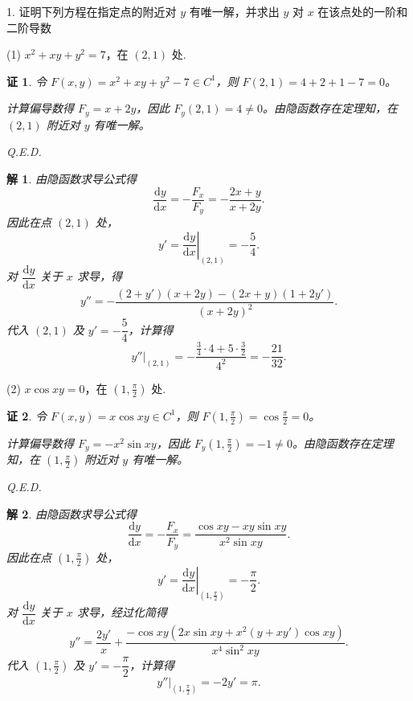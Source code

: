 \documentclass[a4paper,12pt]{article}
\newtheorem*{pf}{证}
\newtheorem*{sol}{解}
\begin{document}
1. 证明下列方程在指定点的附近对 $y$ 有唯一解，并求出 $y$ 对 $x$ 在该点处的一阶和二阶导数

(1) $x^2 + xy + y^2 = 7$，在 $(2,1)$ 处.

\begin{pf}
    令 $F(x,y) = x^2 + xy + y^2 - 7 \in C^1$，则 $F(2,1) = 4 + 2 + 1 - 7 = 0$。

    计算偏导数得 $F_y = x + 2y$，因此 $F_y(2,1) = 4 \neq 0$。由隐函数存在定理知，在 $(2,1)$ 附近对 $y$ 有唯一解。

    Q.E.D.
\end{pf}

\begin{sol}
    由隐函数求导公式得
    $$
        \frac{\mathrm{d}y}{\mathrm{d}x} = -\frac{F_x}{F_y} = -\frac{2x + y}{x + 2y}.
    $$
    因此在点 $(2,1)$ 处，
    $$
        y' = \left.\frac{\mathrm{d}y}{\mathrm{d}x}\right|_{(2,1)} = -\frac{5}{4}.
    $$
    对 $\dfrac{\mathrm{d}y}{\mathrm{d}x}$ 关于 $x$ 求导，得
    $$
        y'' = -\frac{(2 + y')(x + 2y) - (2x + y)(1 + 2y')}{(x + 2y)^2}.
    $$
    代入 $(2,1)$ 及 $y' = -\dfrac{5}{4}$，计算得
    $$
        y''|_{(2,1)} = -\frac{\frac{3}{4} \cdot 4 + 5 \cdot \frac{3}{2}}{4^2} = -\frac{21}{32}.
    $$
\end{sol}

(2) $x\cos xy = 0$，在 $(1,\frac{\pi}{2})$ 处.

\begin{pf}
    令 $F(x,y) = x\cos xy \in C^1$，则 $F(1,\frac{\pi}{2}) = \cos\frac{\pi}{2} = 0$。

    计算偏导数得 $F_y = -x^2\sin xy$，因此 $F_y(1,\frac{\pi}{2}) = -1 \neq 0$。由隐函数存在定理知，在 $(1,\frac{\pi}{2})$ 附近对 $y$ 有唯一解。

    Q.E.D.
\end{pf}

\begin{sol}
    由隐函数求导公式得
    $$
        \frac{\mathrm{d}y}{\mathrm{d}x} = -\frac{F_x}{F_y} = \frac{\cos xy - xy\sin xy}{x^2\sin xy}.
    $$
    因此在点 $(1,\frac{\pi}{2})$ 处，
    $$
        y' = \left.\frac{\mathrm{d}y}{\mathrm{d}x}\right|_{(1,\frac{\pi}{2})} = -\frac{\pi}{2}.
    $$
    对 $\dfrac{\mathrm{d}y}{\mathrm{d}x}$ 关于 $x$ 求导，经过化简得
    $$
        y'' = \frac{2y'}{x} + \frac{-\cos xy(2x\sin xy + x^2(y + xy')\cos xy)}{x^4\sin^2xy}.
    $$
    代入 $(1,\frac{\pi}{2})$ 及 $y' = -\dfrac{\pi}{2}$，计算得
    $$
        y''|_{(1,\frac{\pi}{2})} = -2y' = \pi.
    $$
\end{sol}
\end{document}
